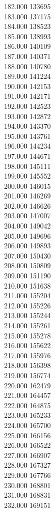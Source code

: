{ 182.000	133695 \\
 183.000	137175 \\
 184.000	138523 \\
 185.000	138993 \\
 186.000	140109 \\
 187.000	140371 \\
 188.000	140780 \\
 189.000	141224 \\
 190.000	142153 \\
 191.000	142171 \\
 192.000	142523 \\
 193.000	142872 \\
 194.000	143370 \\
 195.000	143761 \\
 196.000	144234 \\
 197.000	144671 \\
 198.000	145111 \\
 199.000	145552 \\
 200.000	146015 \\
 201.000	146269 \\
 202.000	146626 \\
 203.000	147007 \\
 204.000	149042 \\
 205.000	149696 \\
 206.000	149893 \\
 207.000	150430 \\
 208.000	150809 \\
 209.000	151190 \\
 210.000	151638 \\
 211.000	155204 \\
 212.000	155226 \\
 213.000	155244 \\
 214.000	155261 \\
 215.000	155278 \\
 216.000	155622 \\
 217.000	155976 \\
 218.000	156398 \\
 219.000	156774 \\
 220.000	162479 \\
 221.000	164457 \\
 222.000	164875 \\
 223.000	165233 \\
 224.000	165700 \\
 225.000	166156 \\
 226.000	166522 \\
 227.000	166907 \\
 228.000	167327 \\
 229.000	167766 \\
 230.000	168801 \\
 231.000	168831 \\
 232.000	169151 \\
}
